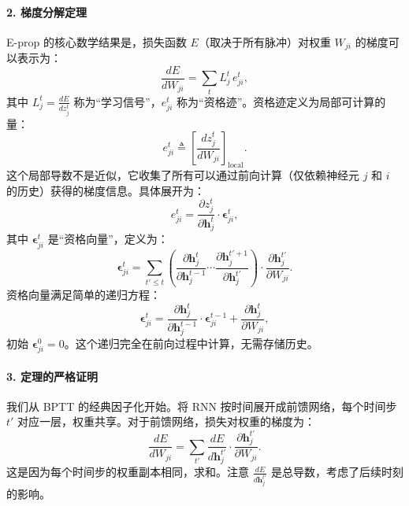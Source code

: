 \documentclass[journal,12pt,onecolumn]{IEEEtran}
\begin{document}
\paragraph{2. 梯度分解定理}
E-prop 的核心数学结果是，损失函数 $E$（取决于所有脉冲）对权重 $W_{ji}$ 的梯度可以表示为：
\[
\frac{dE}{dW_{ji}} = \sum_t L_j^t \, e_{ji}^t,
\]
其中 $L_j^t = \frac{dE}{dz_j^t}$ 称为“学习信号”，$e_{ji}^t$ 称为“资格迹”。资格迹定义为局部可计算的量：
\[
e_{ji}^t \triangleq \left[ \frac{dz_j^t}{dW_{ji}} \right]_{\text{local}}.
\]
这个局部导数不是近似，它收集了所有可以通过前向计算（仅依赖神经元 $j$ 和 $i$ 的历史）获得的梯度信息。具体展开为：
\[
e_{ji}^t = \frac{\partial z_j^t}{\partial \mathbf{h}_j^t} \cdot \boldsymbol{\epsilon}_{ji}^t,
\]
其中 $\boldsymbol{\epsilon}_{ji}^t$ 是“资格向量”，定义为：
\[
\boldsymbol{\epsilon}_{ji}^t = \sum_{t'\le t} \left( \frac{\partial \mathbf{h}_j^t}{\partial \mathbf{h}_j^{t-1}} \cdots \frac{\partial \mathbf{h}_j^{t'+1}}{\partial \mathbf{h}_j^{t'}} \right) \cdot \frac{\partial \mathbf{h}_j^{t'}}{\partial W_{ji}}.
\]
资格向量满足简单的递归方程：
\[
\boldsymbol{\epsilon}_{ji}^t = \frac{\partial \mathbf{h}_j^t}{\partial \mathbf{h}_j^{t-1}} \cdot \boldsymbol{\epsilon}_{ji}^{t-1} + \frac{\partial \mathbf{h}_j^t}{\partial W_{ji}},
\]
初始 $\boldsymbol{\epsilon}_{ji}^{0}=0$。这个递归完全在前向过程中计算，无需存储历史。

\paragraph{3. 定理的严格证明}
我们从 BPTT 的经典因子化开始。将 RNN 按时间展开成前馈网络，每个时间步 $t'$ 对应一层，权重共享。对于前馈网络，损失对权重的梯度为：
\[
\frac{dE}{dW_{ji}} = \sum_{t'} \frac{dE}{d\mathbf{h}_j^{t'}} \cdot \frac{\partial \mathbf{h}_j^{t'}}{\partial W_{ji}}.
\]
这是因为每个时间步的权重副本相同，求和。注意 $\frac{dE}{d\mathbf{h}_j^{t'}}$ 是总导数，考虑了后续时刻的影响。
\end{document}
